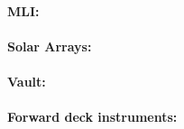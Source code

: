 \paragraph{MLI:}

\paragraph{Solar Arrays:} 

\vspace{-4mm}

\paragraph{Vault:}  %

\vspace{-4mm}

\paragraph{Forward deck instruments:} 

\vspace{-4mm}